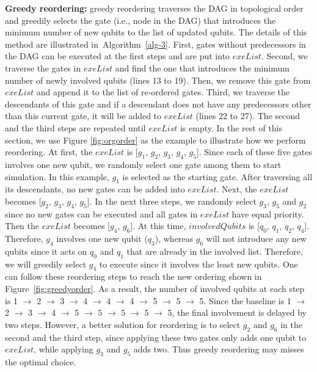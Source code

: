 \noindent\textbf{Greedy reordering:} greedy reordering traverses the DAG in topological order and greedily selects the gate (i.e., node in the DAG) that introduces the minimum number of new qubits to the list of updated qubits.
The details of this method are illustrated in~Algorithm~\ref{alg-3}. First, gates without predecessors in the DAG can be executed at the first steps and are put into $exeList$. Second, we traverse the gates in $exeList$ and find the one that introduces the minimum number of newly involved qubits (lines 13 to 19). Then, we remove this gate from $exeList$ and append it to the list of re-ordered gates. Third, we traverse the descendants of this gate and if a descendant does not have any predecessors other than this current gate, it will be added to $exeList$ (lines 22 to 27). The second and the third steps are repeated until $exeList$ is empty.
In the rest of this section, we use Figure \ref{fig:orgorder} as the example to illustrate how we perform reordering. 
At first, the $exeList$ is [$g_1$, $g_2$, $g_3$, $g_4$, $g_5$]. Since each of these five gates involves one new qubit, we randomly select one gate among them to start simulation. In this example, $g_1$ is selected as the starting gate. After traversing all its descendants, no new gates can be added into $exeList$. 
Next, the $exeList$ becomes [$g_2$, $g_3$, $g_4$, $g_5$].
In the next three steps, we randomly select $g_3$, $g_5$ and $g_2$ since no new gates can be executed and all gates in $exeList$ have equal priority. Then the $exeList$ becomes [$g_4$, $g_6$]. 
At this time, $involvedQubits$ is [$q_0$, $q_1$, $q_2$, $q_4$]. Therefore, $g_4$ involves one new qubit ($q_3$), whereas $g_6$ will not introduce any new qubits since it acts on $q_0$ and $q_1$ that are already in the involved list. 
Therefore, we will greedily select $g_4$ to execute since it involves the least new qubits. 
One can follow these reordering steps to reach the new ordering shown in Figure~\ref{fig:greedyorder}.
As a result, the number of involved qubits at each step is 1 $\to$ 2 $\to$ 3 $\to$ 4 $\to$ 4 $\to$ 4 $\to$ 5 $\to$ 5 $\to$ 5. Since the baseline is 1 $\to$ 2 $\to$ 3 $\to$ 4 $\to$ 5 $\to$ 5 $\to$ 5 $\to$ 5 $\to$ 5, the final involvement is delayed by two steps.
However, a better solution for reordering is to select $g_2$ and $g_6$ in the second and the third step, since applying these two gates only adds one qubit to $exeList$, while applying $g_3$ and $g_5$ adds two. Thus greedy reordering may misses the optimal choice.

